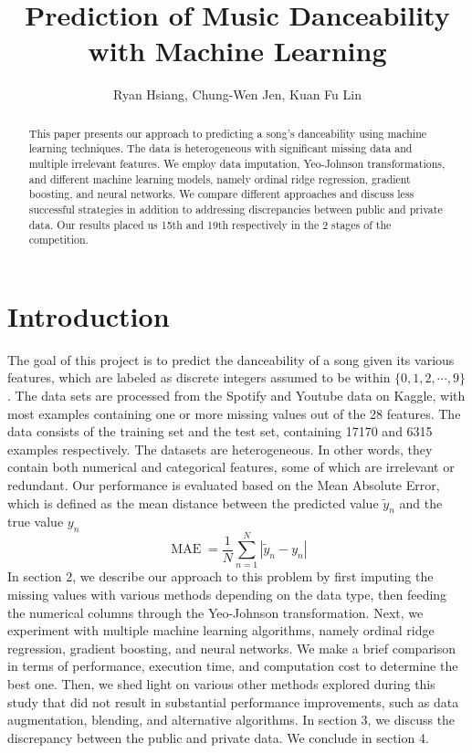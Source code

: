 \documentclass{article}
\title{Prediction of Music Danceability with Machine Learning}
\author{Ryan Hsiang, Chung-Wen Jen, Kuan Fu Lin}
\begin{document}
\maketitle
\begin{abstract}
    This paper presents our approach to predicting a song's danceability using machine learning techniques. The data is heterogeneous with significant missing data and multiple irrelevant features. We employ data imputation, Yeo-Johnson transformations, and different machine learning models, namely ordinal ridge regression, gradient boosting, and neural networks. We compare different approaches and discuss less successful strategies in addition to addressing discrepancies between public and private data. Our results placed us 15th and 19th respectively in the 2 stages of the competition.
\end{abstract}
\section{Introduction}
The goal of this project is to predict the danceability of a song given its various features, which are labeled as discrete integers assumed to be within $\{0,1,2,\cdots, 9\}$.  The data sets are processed from the Spotify and Youtube data on Kaggle, with most examples containing one or more missing values out of the 28 features. The data consists of the training set and the test set, containing 17170 and 6315 examples respectively. The datasets are heterogeneous. In other words, they contain both numerical and categorical features, some of which are irrelevant or redundant. Our performance is evaluated based on the Mean Absolute Error, which is defined as the mean distance between the predicted value $\tilde{y}_n$ and the true value $y_n$
$$\operatorname{MAE}=\frac{1}{N}\sum_{n=1}^N|\tilde{y}_n-y_n|$$
In section 2, we describe our approach to this problem by first imputing the missing values with various methods depending on the data type, then feeding the numerical columns through the Yeo-Johnson transformation. Next, we experiment with multiple machine learning algorithms, namely ordinal ridge regression, gradient boosting, and neural networks. We make a brief comparison in terms of performance, execution time, and computation cost to determine the best one. Then, we shed light on various other methods explored during this study that did not result in substantial performance improvements, such as data augmentation, blending, and alternative algorithms. In section 3, we discuss the discrepancy between the public and private data. We conclude in section 4.
\end{document}
